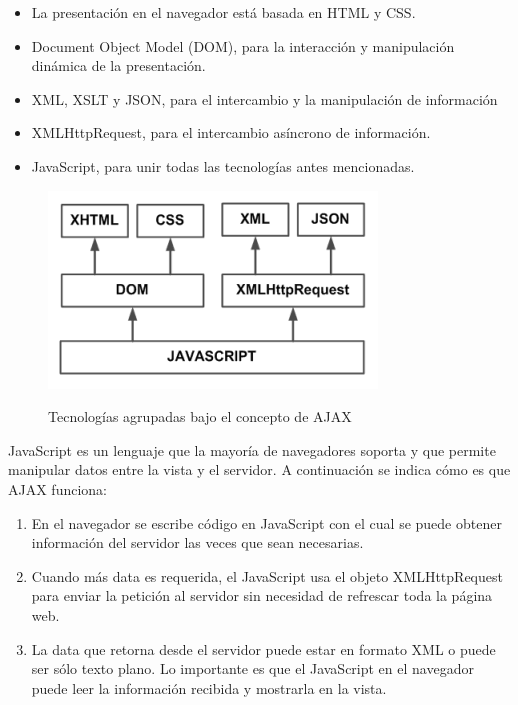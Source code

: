 \begin{itemize}
  \item La presentación en el navegador está basada en HTML y CSS.
  \item Document Object Model (DOM), para la interacción y manipulación dinámica de la presentación.
  \item XML, XSLT y JSON, para el intercambio y la manipulación de información
  \item XMLHttpRequest, para el intercambio asíncrono de información.
  \item JavaScript, para unir todas las tecnologías antes mencionadas.
\end{itemize}
\begin{figure}[h]
  \centering
  \includegraphics[scale=0.8]{figuras/ajax_01.png}\\
  \caption{Tecnologías agrupadas bajo el concepto de AJAX}\label{fig:ajax}
\end{figure}

JavaScript es un lenguaje que la mayoría de navegadores soporta y que permite manipular datos entre la vista y el servidor. A continuación se indica cómo es que AJAX funciona:\cite{ajax_dummies_2006}

\begin{enumerate}
  \item En el navegador se escribe código en JavaScript con el cual se puede obtener información del servidor las veces que sean necesarias.
  \item Cuando más data es requerida, el JavaScript usa el objeto XMLHttpRequest para enviar la petición al servidor sin necesidad de refrescar toda la página web.
  \item La data que retorna desde el servidor puede estar en formato XML o puede ser sólo texto plano. Lo importante es que el JavaScript en el navegador puede leer la información recibida y mostrarla en la vista.
\end{enumerate}

